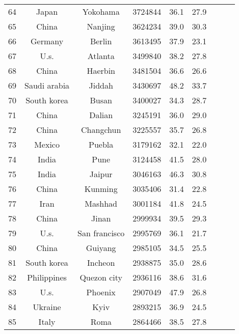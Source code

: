 \begin{table}
\begin{tabular}{ccccccccc}
  64 &               Japan &        Yokohama &    3724844 &     36.1 &     27.9 \\
  65 &               China &         Nanjing &    3624234 &     39.0 &     30.3 \\
  66 &             Germany &          Berlin &    3613495 &     37.9 &     23.1 \\
  67 &                U.s. &         Atlanta &    3499840 &     38.2 &     27.8 \\
  68 &               China &         Haerbin &    3481504 &     36.6 &     26.6 \\
  69 &        Saudi arabia &          Jiddah &    3430697 &     48.2 &     33.7 \\
  70 &         South korea &           Busan &    3400027 &     34.3 &     28.7 \\
  71 &               China &          Dalian &    3245191 &     36.0 &     29.0 \\
  72 &               China &       Changchun &    3225557 &     35.7 &     26.8 \\
  73 &              Mexico &          Puebla &    3179162 &     32.1 &     22.0 \\
  74 &               India &            Pune &    3124458 &     41.5 &     28.0 \\
  75 &               India &          Jaipur &    3046163 &     46.3 &     30.8 \\
  76 &               China &         Kunming &    3035406 &     31.4 &     22.8 \\
  77 &                Iran &         Mashhad &    3001184 &     41.8 &     24.5 \\
  78 &               China &           Jinan &    2999934 &     39.5 &     29.3 \\
  79 &                U.s. &   San francisco &    2995769 &     36.1 &     21.7 \\
  80 &               China &         Guiyang &    2985105 &     34.5 &     25.5 \\
  81 &         South korea &         Incheon &    2938875 &     35.0 &     28.6 \\
  82 &         Philippines &     Quezon city &    2936116 &     38.6 &     31.6 \\
  83 &                U.s. &         Phoenix &    2907049 &     47.9 &     26.8 \\
  84 &             Ukraine &            Kyiv &    2893215 &     36.9 &     24.5 \\
  85 &               Italy &            Roma &    2864466 &     38.5 &     27.8 \\

\end{tabular}
\end{table}
